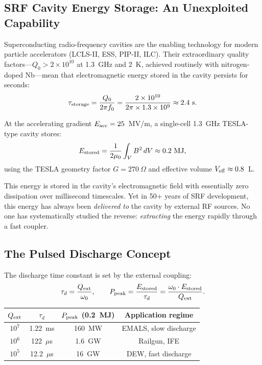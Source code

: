 \documentclass[11pt]{article}
\newcommand{\ee}[1]{\times 10^{#1}}
\newcommand{\Qext}{Q_{\rm ext}}
\newcommand{\Qzero}{Q_0}
\begin{document}
\subsection{SRF Cavity Energy Storage: An Unexploited Capability}

Superconducting radio-frequency cavities are the enabling technology
for modern particle accelerators (LCLS-II, ESS, PIP-II, ILC). Their
extraordinary quality factors---$\Qzero > 2\ee{10}$ at 1.3~GHz and
2~K, achieved routinely with nitrogen-doped Nb---mean that
electromagnetic energy stored in the cavity persists for seconds:
\begin{equation}
\tau_{\rm storage} = \frac{\Qzero}{2\pi f_0}
= \frac{2\ee{10}}{2\pi \times 1.3\ee{9}} \approx 2.4~\text{s}.
\label{eq:storage-time}
\end{equation}

At the accelerating gradient $E_{\rm acc} = 25$~MV/m, a single-cell
1.3~GHz TESLA-type cavity stores:
\begin{equation}
E_{\rm stored} = \frac{1}{2\mu_0}
\int_V B^2 \, dV \approx 0.2~\text{MJ},
\label{eq:stored-energy}
\end{equation}
using the TESLA geometry factor $G = 270~\Omega$ and effective
volume $V_{\rm eff} \approx 0.8$~L.

This energy is stored in the cavity's electromagnetic field with
essentially zero dissipation over millisecond timescales. Yet in 50+
years of SRF development, this energy has always been \emph{delivered
to} the cavity by external RF sources. No one has systematically
studied the reverse: \emph{extracting} the energy rapidly through a
fast coupler.

\subsection{The Pulsed Discharge Concept}

The discharge time constant is set by the external coupling:
\begin{equation}
\tau_d = \frac{\Qext}{\omega_0}, \qquad
P_{\rm peak} = \frac{E_{\rm stored}}{\tau_d}
= \frac{\omega_0 \cdot E_{\rm stored}}{\Qext}.
\label{eq:discharge}
\end{equation}

\begin{center}
\begin{tabular}{cccc}
\toprule
$\Qext$ & $\tau_d$ & $P_{\rm peak}$ (0.2~MJ) & Application regime \\
\midrule
$10^7$ & 1.22~ms & 160~MW & EMALS, slow discharge \\
$10^6$ & 122~$\mu$s & 1.6~GW & Railgun, IFE \\
$10^5$ & 12.2~$\mu$s & 16~GW & DEW, fast discharge \\
\bottomrule
\end{tabular}
\end{center}
\end{document}
